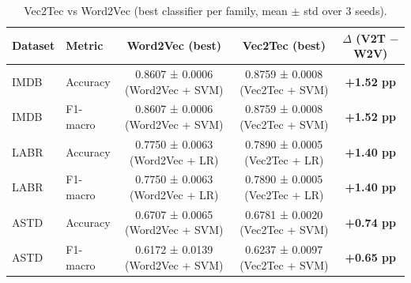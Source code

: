 \begin{table}[ht]
\centering
\caption{Vec2Tec vs Word2Vec (best classifier per family, mean $\pm$ std over 3 seeds).}
\label{tab:vec2tec_vs_w2v}
\begin{tabular}{llccc}
\toprule
Dataset & Metric & Word2Vec (best) & Vec2Tec (best) & $\Delta$ (V2T $-$ W2V) \\
\midrule
IMDB & Accuracy & 0.8607 ± 0.0006  (Word2Vec + SVM) & 0.8759 ± 0.0008  (Vec2Tec + SVM) & \textbf{+1.52 pp} \\
IMDB & F1-macro & 0.8607 ± 0.0006  (Word2Vec + SVM) & 0.8759 ± 0.0008  (Vec2Tec + SVM) & \textbf{+1.52 pp} \\
LABR & Accuracy & 0.7750 ± 0.0063  (Word2Vec + LR) & 0.7890 ± 0.0005  (Vec2Tec + LR) & \textbf{+1.40 pp} \\
LABR & F1-macro & 0.7750 ± 0.0063  (Word2Vec + LR) & 0.7890 ± 0.0005  (Vec2Tec + LR) & \textbf{+1.40 pp} \\
ASTD & Accuracy & 0.6707 ± 0.0065  (Word2Vec + SVM) & 0.6781 ± 0.0020  (Vec2Tec + SVM) & \textbf{+0.74 pp} \\
ASTD & F1-macro & 0.6172 ± 0.0139  (Word2Vec + SVM) & 0.6237 ± 0.0097  (Vec2Tec + SVM) & \textbf{+0.65 pp} \\
\bottomrule
\end{tabular}
\end{table}